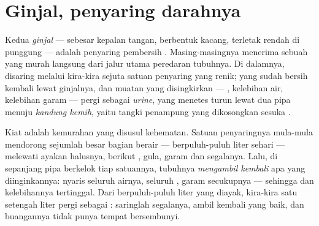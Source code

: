 \section{Ginjal, penyaring darahnya}

\begin{definition}\label{def:g7:removing-wastes:kidneys}
Kedua \emph{ginjal} --- sebesar kepalan tangan,
berbentuk kacang, terletak rendah di punggung --- adalah penyaring
pembersih . Masing-masingnya menerima sebuah  yang murah
 langsung dari jalur utama peredaran tubuhnya. Di dalamnya,
 disaring melalui kira-kira sejuta satuan penyaring yang
renik;  yang sudah bersih kembali lewat  ginjalnya, dan
muatan yang disingkirkan --- , kelebihan air, kelebihan garam ---
pergi sebagai \emph{urine}, yang menetes turun lewat dua
pipa menuju \emph{kandung kemih}, yaitu tangki
penampung yang dikosongkan sesuka .
\end{definition}

\begin{proposition}\label{prop:g7:removing-wastes:filter}
Kiat  adalah kemurahan  yang disusul kehematan. Satuan
penyaringnya mula-mula mendorong sejumlah besar bagian berair 
--- berpuluh-puluh liter sehari --- melewati ayakan halusnya, berikut
, gula, garam dan segalanya. Lalu, di sepanjang pipa berkelok tiap
satuannya, tubuhnya \emph{mengambil kembali} apa yang diinginkannya:
nyaris seluruh airnya, seluruh , garam secukupnya ---
sehingga  dan kelebihannya tertinggal. Dari berpuluh-puluh liter
yang diayak, kira-kira satu setengah liter pergi sebagai :
saringlah segalanya, ambil kembali yang baik, dan buangannya tidak
punya tempat bersembunyi.
\end{proposition}
\admitted

